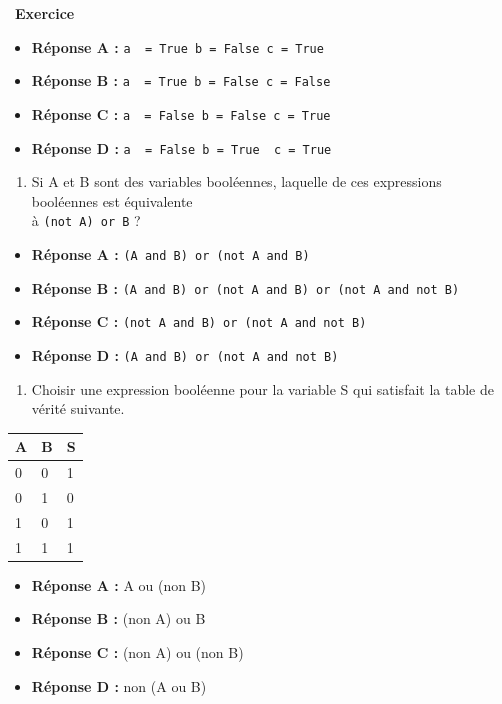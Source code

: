 \documentclass[
  11pt,
]{article}
\newcommand{\passthrough}[1]{#1}
\providecommand{\tightlist}{%
  \setlength{\itemsep}{0pt}\setlength{\parskip}{0pt}}
\newcounter{exo}
\newenvironment{exercice}[1]
{\par \medskip   \addtocounter{exo}{1} \noindent  
\begin{bclogo}[arrondi =0.1,   noborder = true, logo=\bccrayon, marge=4]{~\textbf{Exercice} \textbf{\theexo} {\itshape #1} }  \par}
{
\end{bclogo}
 \par \bigskip }
\newcounter{def}
\begin{document}
\begin{exercice}{}
\begin{itemize}
\tightlist
\item
  \textbf{Réponse A :}
  \passthrough{\lstinline!a  = True b = False c = True!}
\item
  \textbf{Réponse B :}
  \passthrough{\lstinline!a  = True b = False c = False!}
\item
  \textbf{Réponse C :}
  \passthrough{\lstinline!a  = False b = False c = True!}
\item
  \textbf{Réponse D :}
  \passthrough{\lstinline!a  = False b = True  c = True!}
\end{itemize}

\begin{enumerate}
\def\labelenumi{\arabic{enumi}.}
\setcounter{enumi}{3}
\tightlist
\item
  Si A et B sont des variables booléennes, laquelle de ces expressions
  booléennes est équivalente\\
  à \passthrough{\lstinline!(not A) or B!} ?
\end{enumerate}

\begin{itemize}
\tightlist
\item
  \textbf{Réponse A :}
  \passthrough{\lstinline!(A and B) or (not A and B)!}
\item
  \textbf{Réponse B :}
  \passthrough{\lstinline!(A and B) or (not A and B) or (not A and not B)!}
\item
  \textbf{Réponse C :}
  \passthrough{\lstinline!(not A and B) or (not A and not B)!}
\item
  \textbf{Réponse D :}
  \passthrough{\lstinline!(A and B) or (not A and not B)!}
\end{itemize}

\begin{enumerate}
\def\labelenumi{\arabic{enumi}.}
\setcounter{enumi}{4}
\tightlist
\item
  Choisir une expression booléenne pour la variable S qui satisfait la
  table de vérité suivante.
\end{enumerate}

\begin{longtable}[]{@{}lll@{}}
\toprule
A & B & S\tabularnewline
\midrule
\endhead
0 & 0 & 1\tabularnewline
0 & 1 & 0\tabularnewline
1 & 0 & 1\tabularnewline
1 & 1 & 1\tabularnewline
\bottomrule
\end{longtable}

\begin{itemize}
\tightlist
\item
  \textbf{Réponse A :} A ou (non B)
\item
  \textbf{Réponse B :} (non A) ou B
\item
  \textbf{Réponse C :} (non A) ou (non B)
\item
  \textbf{Réponse D :} non (A ou B)
\end{itemize}


\end{exercice}
\end{document}
